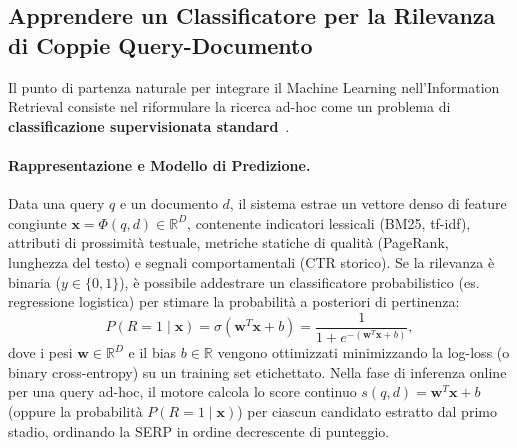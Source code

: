 \FloatBarrier
\subsection{Apprendere un Classificatore per la Rilevanza di Coppie Query-Documento}
\label{subsec:apprendere-classificatore-coppia}

Il punto di partenza naturale per integrare il Machine Learning nell'Information Retrieval consiste nel riformulare la ricerca ad-hoc come un problema di \textbf{classificazione supervisionata standard}~\cite{manning2008,bruch2023}.

\paragraph{Rappresentazione e Modello di Predizione.}
Data una query $q$ e un documento $d$, il sistema estrae un vettore denso di feature congiunte $\mathbf{x} = \Phi(q, d) \in \mathbb{R}^D$, contenente indicatori lessicali (BM25, tf-idf), attributi di prossimità testuale, metriche statiche di qualità (PageRank, lunghezza del testo) e segnali comportamentali (CTR storico).  
Se la rilevanza \`e binaria ($y \in \{0, 1\}$), \`e possibile addestrare un classificatore probabilistico (es. regressione logistica) per stimare la probabilit\`a a posteriori di pertinenza:
\begin{equation}
P(R = 1 \mid \mathbf{x}) = \sigma(\mathbf{w}^T \mathbf{x} + b) = \frac{1}{1 + e^{-(\mathbf{w}^T \mathbf{x} + b)}},
\label{eq:logistic-classifier-adhoc}
\end{equation}
dove i pesi $\mathbf{w} \in \mathbb{R}^D$ e il bias $b \in \mathbb{R}$ vengono ottimizzati minimizzando la log-loss (o binary cross-entropy) su un training set etichettato.  
Nella fase di inferenza online per una query ad-hoc, il motore calcola lo score continuo $s(q, d) = \mathbf{w}^T \mathbf{x} + b$ (oppure la probabilit\`a $P(R=1 \mid \mathbf{x})$) per ciascun candidato estratto dal primo stadio, ordinando la SERP in ordine decrescente di punteggio.

